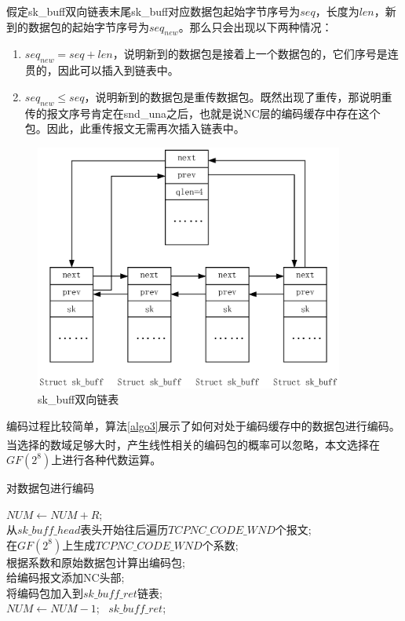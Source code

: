 \par
假定sk\_buff双向链表末尾sk\_buff对应数据包起始字节序号为$seq$，长度为$len$，新到的数据包的起始字节序号为$seq_{new}$。那么只会出现以下两种情况：
\begin{enumerate}[fullwidth,itemindent=2em,label=(\arabic*)]
	\item $seq_{new}=seq+len$，说明新到的数据包是接着上一个数据包的，它们序号是连贯的，因此可以插入到链表中。
	\item $seq_{new} \le seq$，说明新到的数据包是重传数据包。既然出现了重传，那说明重传的报文序号肯定在snd\_una之后，也就是说NC层的编码缓存中存在这个包。因此，此重传报文无需再次插入链表中。
\end{enumerate}
\begin{figure}[htbp]
	\centering
	\includegraphics[width=4in]{figures/skbufflink.eps}
	\caption{sk\_buff双向链表}
	\label{SKBUFFLINK_EPS}
\end{figure}
\par
编码过程比较简单，算法\ref{algo3}展示了如何对处于编码缓存中的数据包进行编码。当选择的数域足够大时，产生线性相关的编码包的概率可以忽略\textsuperscript{\cite{fragouli2006network}}，本文选择在$GF\left(2^8\right)$上进行各种代数运算。
\renewcommand{\algorithmcfname}{算法}
\begin{algorithm}
	\caption{对数据包进行编码} 
	
	\label{algo3}
	$NUM \leftarrow NUM+R$;\\
	{  
		从$sk\_buff\_head$表头开始往后遍历$TCPNC\_CODE\_WND$个报文;\\
		在$GF\left(2^8\right)$上生成$TCPNC\_CODE\_WND$个系数;\\
		根据系数和原始数据包计算出编码包;\\
		给编码报文添加NC头部;\\
		将编码包加入到$sk\_buff\_ret$链表;\\
		$NUM \leftarrow NUM-1$;
	}
	\Return \ $sk\_buff\_ret$;
\end{algorithm}

